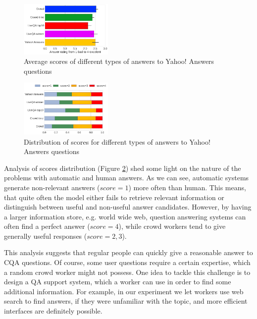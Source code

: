 \documentclass[11pt,letterpaper]{article}
\begin{document}
\begin{figure}[h]
	\centering
	\includegraphics[width=0.4\textwidth]{img/average_score}
	\caption{Average scores of different types of answers to Yahoo! Answers questions}
	\label{fig:average_score}
\end{figure}

\begin{figure}[h]
	\centering
	\includegraphics[width=0.4\textwidth]{img/scores_distribution}
	\caption{Distribution of scores for different types of answers to Yahoo! Answers questions}
	\label{fig:scores_distribution}
\end{figure}


Analysis of scores distribution (Figure \ref{fig:scores_distribution}) shed some light on the nature of the problems with automatic and human answers.
As we can see, automatic systems generate non-relevant answers ($score=1$) more often than human.
This means, that quite often the model either fails to retrieve relevant information or distinguish between useful and non-useful answer candidates.
However, by having a larger information store, e.g. world wide web, question answering systems can often find a perfect answer ($score=4$), while crowd workers tend to give generally useful responses ($score=2,3$).

This analysis suggests that regular people can quickly give a reasonable answer to CQA questions.
Of course, some user questions require a certain expertise, which a random crowd worker might not possess.
One idea to tackle this challenge is to design a QA support system, which a worker can use in order to find some additional information.
For example, in our experiment we let workers use web search to find answers, if they were unfamiliar with the topic, and more efficient interfaces are definitely possible.
\end{document}
